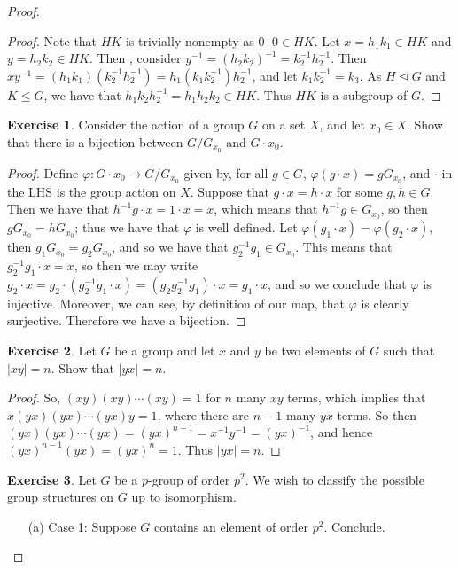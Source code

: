 \documentclass[9pt,reqno]{amsart}
\theoremstyle{definition}
\newtheorem{exercise}{Exercise}[section]
\begin{document}
\begin{proof}
\begin{proof}
	Note that $HK$ is trivially nonempty as $0 \cdot 0  \in HK$. Let $x = h_1 k_1 \in HK$ and $ y= h_2 k_2 \in HK$. Then , consider $y^{-1} = (h_2 k_2)^{-1} = k_2^{-1} h_2^{-1}$. Then $xy^{-1} = (h_1 k _1 )(k_2^{-1} h_2^{-1}) = h_1(k_1 k_2^{-1}) h_2^{-1}$, and let $k_1 k_2^{-1} = k_3$. As $H \trianglelefteq G$ and $K \leq G$, we have that $h_1 k_2 h_2^{-1}  = h_1 h_2 k_2 \in HK$. Thus $HK$ is a subgroup of $G$. 
\end{proof}
\begin{exercise}
Consider the action of a group $G$ on a set $X$, and let $x_0 \in X$. Show that there is a bijection between $G/ G_{x_0} $ and $G \cdot x_0$.	
\end{exercise}
\begin{proof}
	Define $\varphi \colon G \cdot x_0 \rightarrow G/G_{x_0}$ given by, for all $g \in G$, $\varphi(g \cdot x) = g G_{x_0} $, and $\cdot$ in the LHS is the group action on $X$. Suppose that $g \cdot x = h \cdot x$ for some $g, h \in G$. Then we have that $h^{-1} g \cdot x = 1 \cdot x =x$, which means that $h^{-1} g \in G_{x_0}$, so then $g G_{x_0} = h G_{x_0}$; thus we have that $\varphi $ is well defined. Let $\varphi (g_1  \cdot x) = \varphi (g_2 \cdot x)$, then $g_1 G_{x_0} = g_2 G_{x_0}$, and so we have that $g_2^{-1} g_1 \in G_{x_0}$. This means that $g_2^{-1} g_1 \cdot x = x $, so then we may write $g_2 \cdot x = g_2 \cdot (g_2^{-1} g_1 \cdot x)= (g_2 g_2^{-1} g_1)\cdot x = g_1 \cdot x$, and so we conclude that $\varphi$ is injective. Moreover, we can see, by definition of our map, that $\varphi $ is clearly surjective. Therefore we have a bijection. 
\end{proof}
\begin{exercise}
	Let $G$ be a group and let $x$ and $y$ be two elements of $G$ such that $|xy| = n$. Show that $|yx| = n$. 
\end{exercise}
\begin{proof}
	So, $(xy)(xy)\cdots (xy) = 1$ for $n$ many $xy$ terms, which implies that  $x(yx)(yx) \cdots (yx)y = 1$, where there are $n-1$ many $yx$ terms. So then $(yx)(yx)\cdots (yx) = (yx)^{n-1} =  x^{-1} y^{-1} = (yx)^{-1}$, and hence $(yx)^{n-1} (yx) = (yx)^n = 1$. Thus $|yx| = n$. \end{proof}
	\begin{exercise}Let $G$ be a $p$-group of order $p^2$. We wish to classify the possible group structures on $G$ up to isomorphism.
		\begin{itemize} 
		\item[(a)]Case 1: Suppose $G$ contains an element of order $p^2$. Conclude.

\end{itemize}
\end{exercise}
\end{proof}
\end{document}
